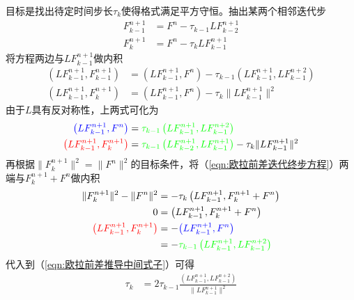 \documentclass{ctexart}
\begin{document}
\begin{appendix}
目标是找出待定时间步长$\tau_k$使得格式满足平方守恒。抽出某两个相邻迭代步
\begin{align}
  F_{k-1}^{n+1} & = F^n - \tau_{k-1} L F_{k-2}^{n+1} \\
  F_k^{n+1} & = F^n - \tau_k L F_{k-1}^{n+1} \label{eqn:欧拉前差迭代终步方程}
\end{align}
将方程两边与$L F_{k-1}^{n+1}$做内积
\begin{align*}
  \left( L F_{k-1}^{n+1}, F_{k-1}^{n+1} \right) & = \left( L F_{k-1}^{n+1}, F^n \right) - \tau_{k-1} \left( L F_{k-1}^{n+1}, L F_{k-1}^{n+2} \right) \\
  \left( L F_{k-1}^{n+1}, F_k^{n+1} \right) & = \left( L F_{k-1}^{n+1}, F^n \right) - \tau_k \lVert L F_{k-1}^{n+1} \rVert^2
\end{align*}
由于$L$具有反对称性，上两式可化为
\begin{align}
  {\color{blue}\left( L F_{k-1}^{n+1}, F^n \right)} & = {\color{green}\tau_{k-1} \left( L F_{k-1}^{n+1}, L F_{k-1}^{n+2} \right)} \nonumber \\
  {\color{red}\left( L F_{k-1}^{n+1}, F_k^{n+1} \right)} & = {\color{green}\tau_{k-1} \left( L F_{k-2}^{n+1}, L F_{k-1}^{n+1} \right)} - \tau_k \lVert L F_{k-1}^{n+1} \rVert^2 \label{eqn:欧拉前差推导中间式子}
\end{align}
再根据$\lVert F_k^{n+1} \rVert^2 = \lVert F^n \rVert^2$的目标条件，将（\ref{eqn:欧拉前差迭代终步方程}）两端与$F_k^{n+1} + F^n$做内积
\begin{align*}
  \lVert F_k^{n+1} \rVert^2 - \lVert F^n \rVert^2 & = - \tau_k \left( L F_{k-1}^{n+1}, F_k^{n+1} + F^n \right) \\
  0 & = \left( L F_{k-1}^{n+1}, F_k^{n+1} + F^n \right) \\
  {\color{red}\left( L F_{k-1}^{n+1}, F_k^{n+1} \right)} & = - {\color{blue}\left( L F_{k-1}^{n+1}, F^n \right)} \\
  & = - {\color{green}\tau_{k-1} \left( L F_{k-1}^{n+1}, L F_{k-1}^{n+2} \right)}
\end{align*}
代入到（\ref{eqn:欧拉前差推导中间式子}）可得
\begin{align*}
  \tau_k & = 2 \tau_{k-1} \frac{\left( L F_{k-1}^{n+1}, L F_{k-1}^{n+2} \right)}{\lVert L F_{k-1}^{n+1} \rVert^2}
\end{align*}

\end{appendix}
\end{document}
